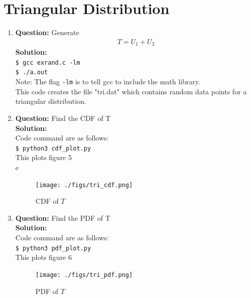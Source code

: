 \documentclass[journal,12pt,twocolumn]{IEEEtran}
\begin{document}
\section{Triangular Distribution}
\begin{enumerate}[label=\thesection.\arabic*
,ref=\thesection.\theenumi]
        \item\textbf{Question:} Generate
        \begin{align}
            T = U_1 + U_2
        \end{align}
        \textbf{Solution:}\\
\texttt{\$ gcc exrand.c -lm}\\
\texttt{\$ ./a.out}\\
Note: The flag \texttt{-lm} is to tell gcc to include the math library.\\ 
This code creates the file "tri.dat" which contains random data points for a triangular distribution.
\item\textbf{Question: } Find the CDF of T\\
    \textbf{Solution: }\\
Code command are as follows:\\
\texttt{\$ python3 cdf\_plot.py}\\
This plots figure 5\\e
\begin{figure}[!ht]
\centering
\texttt{[image: ./figs/tri\_cdf.png]}
\caption{CDF of $T$}
\label{fig:CDF_T}
\end{figure}


\item\textbf{Question: } Find the PDF of T\\
    \textbf{Solution: }\\
Code command are as follows:\\
\texttt{\$ python3 pdf\_plot.py}\\
This plots figure 6\\
\begin{figure}[!ht]
\centering
\texttt{[image: ./figs/tri\_pdf.png]}
\caption{PDF of $T$}
\label{fig:PDF_T}
\end{figure}



\end{enumerate}
\end{document}
